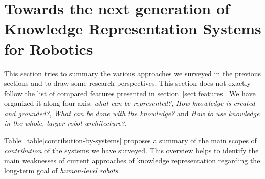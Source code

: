 \section{Towards the next generation of Knowledge Representation Systems for Robotics}
\label{sect|conclusion}

This section tries to summary the various approaches we surveyed in the
previous sections and to draw some research perspectives. This section does not
exactly follow the list of compared features presented in
section~\ref{sect|features}. We have organized it along four axis: \emph{what
can be represented?}, \emph{How knowledge is created and grounded?}, \emph{What
can be done with the knowledge?} and \emph{How to use knowledge in the whole,
larger robot architecture?}.

Table~\ref{table|contribution-by-systems} proposes a summary of the main scopes
of \emph{contribution} of the systems we have surveyed. This overview helps to
identify the main weaknesses of current approaches of knowledge representation
regarding the long-term goal of \emph{human-level robots}.

